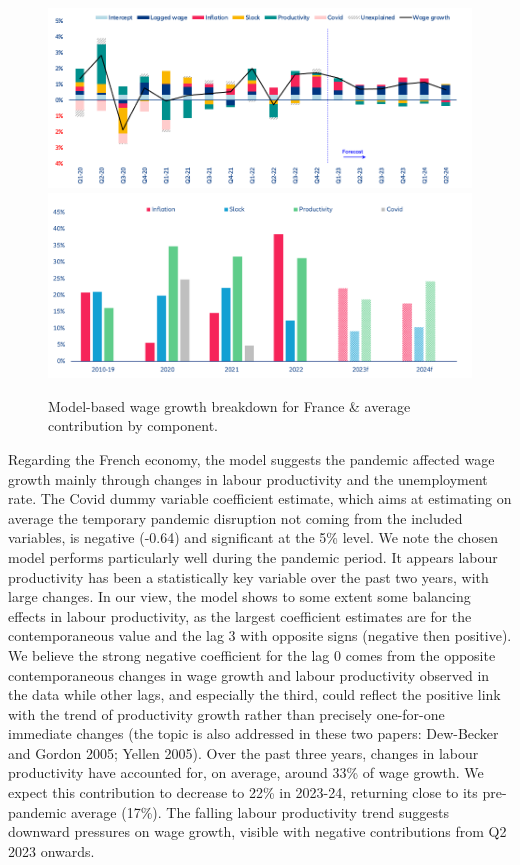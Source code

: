 \begin{figure}[H]
    \centering
    \caption{Model-based wage growth breakdown for France \& average contribution by component.}
    \includegraphics[width=.8\textwidth]{Core/2.Labour/img/Franceb1.png}
    \includegraphics[width=.8\textwidth]{Core/2.Labour/img/Franceb2.png}
    \label{figure:frbreakdown}
\end{figure}

Regarding the French economy, the model suggests the pandemic affected wage growth mainly through changes in labour productivity and the unemployment rate. 
The Covid dummy variable coefficient estimate, which aims at estimating on average the temporary pandemic disruption not coming from the included variables, is negative (-0.64) and significant at the 5\% level. 
We note the chosen model performs particularly well during the pandemic period. 
It appears labour productivity has been a statistically key variable over the past two years, with large changes. 
In our view, the model shows to some extent some balancing effects in labour productivity, as the largest coefficient estimates are for the contemporaneous value and the lag 3 with opposite signs (negative then positive). 
We believe the strong negative coefficient for the lag 0 comes from the opposite contemporaneous changes in wage growth and labour productivity observed in the data while other lags, and especially the third, could reflect the positive link with the trend of productivity growth rather than precisely one-for-one immediate changes (the topic is also addressed in these two papers: Dew-Becker and Gordon 2005; Yellen 2005). 
Over the past three years, changes in labour productivity have accounted for, on average, around 33\% of wage growth. 
We expect this contribution to decrease to 22\% in 2023-24, returning close to its pre-pandemic average (17\%). 
The falling labour productivity trend suggests downward pressures on wage growth, visible with negative contributions from Q2 2023 onwards. 

